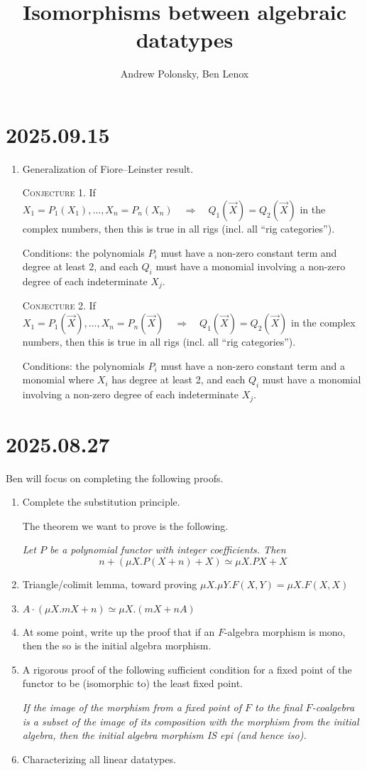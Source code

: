 \documentclass[letterpaper,numbers=enddot]{scrartcl}
\title{Isomorphisms between algebraic datatypes}
\author{Andrew Polonsky, Ben Lenox}
\newcommand{\then}{\quad\mathrel{\Longrightarrow}\quad}
\begin{document}
\section{2025.09.15}
\begin{enumerate}
  \item Generalization of Fiore--Leinster result.

  \textsc{Conjecture 1.}
  If $X_1=P_1(X_1),\dots,X_n=P_n(X_n) \then Q_1(\vec X) = Q_2(\vec X)$
  in the complex numbers, then this is true in all rigs (incl. all ``rig categories'').

  Conditions: the polynomials $P_i$ must have a non-zero constant term and degree at least 2,
  and each $Q_i$ must have a monomial involving a non-zero degree of each indeterminate $X_j$.

  \textsc{Conjecture 2.}
  If $X_1=P_1(\vec X),\dots,X_n=P_n(\vec X) \then Q_1(\vec X) = Q_2(\vec X)$
  in the complex numbers, then this is true in all rigs (incl. all ``rig categories'').

  Conditions: the polynomials $P_i$ must have a non-zero constant term and a monomial where $X_i$ has degree at least 2,
  and each $Q_i$ must have a monomial involving a non-zero degree of each indeterminate $X_j$.
  

\end{enumerate}

\section*{2025.08.27}

Ben will focus on completing the following proofs.
\begin{enumerate}
  \item Complete the substitution principle.

  The theorem we want to prove is the following.

  \emph{Let $P$ be a polynomial functor with integer coefficients. Then}
  \[n + (\mu X. P(X + n) + X) \simeq \mu X. PX + X\]
  \item Triangle/colimit lemma, toward proving $\mu X. \mu Y. F(X,Y) = \mu X. F(X,X)$
  \item $A \cdot (\mu X. m X + n) \simeq \mu X. (m X + n A)$
  \item At some point, write up the proof that if an $F$-algebra morphism is
  mono, then the so is the initial algebra morphism.
  \item A rigorous proof of the following sufficient condition for a fixed
  point of the functor to be (isomorphic to) the least fixed point.

  \emph{If the image of the morphism from a fixed point of $F$ to the final $F$-coalgebra
  is a subset of the image of its composition with the morphism from the initial algebra,
  then the initial algebra morphism IS epi (and hence iso).}

  \item Characterizing all linear datatypes.
\end{enumerate}
\end{document}
